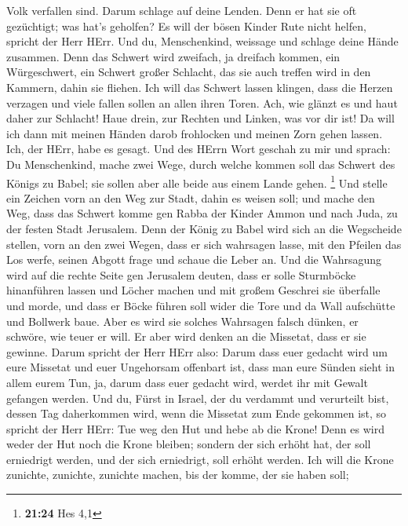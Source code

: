 Volk verfallen sind. Darum schlage auf deine Lenden. 
Denn er hat sie oft gezüchtigt; was hat's geholfen? Es will der bösen
Kinder Rute nicht helfen, spricht der Herr HErr.  Und du,
Menschenkind, weissage und schlage deine Hände zusammen. Denn das
Schwert wird zweifach, ja dreifach kommen, ein Würgeschwert, ein Schwert
großer Schlacht, das sie auch treffen wird in den Kammern, dahin sie
fliehen.  Ich will das Schwert lassen klingen, dass die
Herzen verzagen und viele fallen sollen an allen ihren Toren. Ach, wie
glänzt es und haut daher zur Schlacht!  Haue drein, zur
Rechten und Linken, was vor dir ist!  Da will ich dann
mit meinen Händen darob frohlocken und meinen Zorn gehen lassen. Ich,
der HErr, habe es gesagt.  Und des HErrn Wort geschah zu
mir und sprach:  Du Menschenkind, mache zwei Wege, durch
welche kommen soll das Schwert des Königs zu Babel; sie sollen aber alle
beide aus einem Lande gehen. \footnote{\textbf{21:24} Hes 4,1}
 Und stelle ein Zeichen vorn an den Weg zur Stadt, dahin
es weisen soll; und mache den Weg, dass das Schwert komme gen Rabba der
Kinder Ammon und nach Juda, zu der festen Stadt Jerusalem.
 Denn der König zu Babel wird sich an die Wegscheide
stellen, vorn an den zwei Wegen, dass er sich wahrsagen lasse, mit den
Pfeilen das Los werfe, seinen Abgott frage und schaue die Leber an.
 Und die Wahrsagung wird auf die rechte Seite gen
Jerusalem deuten, dass er solle Sturmböcke hinanführen lassen und Löcher
machen und mit großem Geschrei sie überfalle und morde, und dass er
Böcke führen soll wider die Tore und da Wall aufschütte und Bollwerk
baue.  Aber es wird sie solches Wahrsagen falsch dünken,
er schwöre, wie teuer er will. Er aber wird denken an die Missetat, dass
er sie gewinne.  Darum spricht der Herr HErr also: Darum
dass euer gedacht wird um eure Missetat und euer Ungehorsam offenbart
ist, dass man eure Sünden sieht in allem eurem Tun, ja, darum dass euer
gedacht wird, werdet ihr mit Gewalt gefangen werden.  Und
du, Fürst in Israel, der du verdammt und verurteilt bist, dessen Tag
daherkommen wird, wenn die Missetat zum Ende gekommen ist,
 so spricht der Herr HErr: Tue weg den Hut und hebe ab
die Krone! Denn es wird weder der Hut noch die Krone bleiben; sondern
der sich erhöht hat, der soll erniedrigt werden, und der sich
erniedrigt, soll erhöht werden.  Ich will die Krone
zunichte, zunichte, zunichte machen, bis der komme, der sie haben soll;

